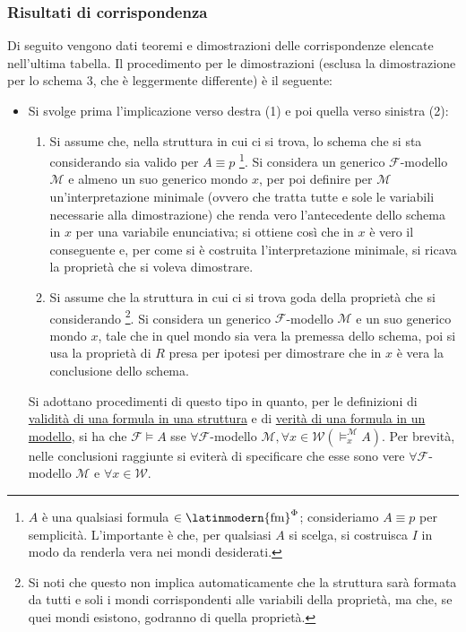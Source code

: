 \documentclass[a4paper,12pt]{article}
\newcommand{\latinmath}[1]{\text{\latinmodern{#1}}} %
\begin{document}
\subsubsection{Risultati di corrispondenza}
\noindent Di seguito vengono dati teoremi e dimostrazioni delle corrispondenze elencate nell'ultima tabella. Il procedimento per le dimostrazioni (esclusa la dimostrazione per lo schema $3$, che è leggermente differente) è il seguente: 
\begin{itemize}
	\item Si svolge prima l'implicazione verso destra (1) e poi quella verso sinistra (2):
	\begin{enumerate}
	\item Si assume che, nella struttura in cui ci si trova, lo schema che si sta considerando sia valido per $A \equiv p$ \footnote{$A$ è una qualsiasi formula $\in \latinmath{fm}^{\Phi}$; consideriamo $A \equiv p$ per semplicità. L'importante è che, per qualsiasi $A$ si scelga, si costruisca $I$ in modo da renderla vera nei mondi desiderati.}. Si considera un generico $\mathcal{F}$-modello $\mathcal{M}$ e almeno un suo generico mondo $x$, per poi definire per $\mathcal{M}$ un'interpretazione minimale (ovvero che tratta tutte e sole le variabili necessarie alla dimostrazione) che renda vero l'antecedente dello schema in $x$ per una variabile enunciativa; si ottiene così che in $x$ è vero il conseguente e, per come si è costruita l'interpretazione minimale, si ricava la proprietà che si voleva dimostrare.
	\item Si assume che la struttura in cui ci si trova goda della proprietà che si considerando \footnote{Si noti che questo non implica automaticamente che la struttura sarà formata da tutti e soli i mondi corrispondenti alle variabili della proprietà, ma che, se quei mondi esistono, godranno di quella proprietà.}. Si considera un generico $\mathcal{F}$-modello $\mathcal{M}$ e un suo generico mondo $x$, tale che in quel mondo sia vera la premessa dello schema, poi si usa la proprietà di $R$ presa per ipotesi per dimostrare che in $x$ è vera la conclusione dello schema. 
	\end{enumerate}
	Si adottano procedimenti di questo tipo in quanto, per le definizioni di \hyperlink{valstrut}{validità di una formula in una struttura} e di \hyperlink{vermod}{verità di una formula in un modello}, si ha che $\mathcal{F} \vDash A$ sse $\forall \mathcal{F}$-modello $\mathcal{M}, \forall x \in \mathcal{W} (\vDash_{x}^{\mathcal{M}} A)$. Per brevità, nelle conclusioni raggiunte si eviterà di specificare che esse sono vere $\forall \mathcal{F}$-modello $\mathcal{M}$ e $\forall x \in \mathcal{W}$. \\
\end{itemize}
\end{document}
